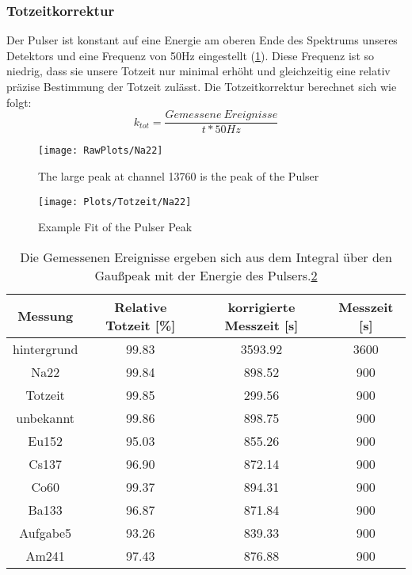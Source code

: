 \documentclass[]{article}
\begin{document}
	\subsubsection{Totzeitkorrektur} 
	Der Pulser ist konstant auf eine Energie am oberen Ende des Spektrums unseres Detektors und eine Frequenz von 50Hz eingestellt (\ref{fig:rawNa22}). Diese Frequenz ist so niedrig, dass sie unsere Totzeit nur minimal erhöht und gleichzeitig eine relativ präzise Bestimmung der Totzeit zulässt. Die Totzeitkorrektur berechnet sich wie folgt:
	\begin{equation}
	k_{tot}=\frac{Gemessene \: Ereignisse}{t*50Hz}
	\end{equation}
	\begin{figure}
		\centering
		\texttt{[image: RawPlots/Na22]}
		\caption{The large peak at channel 13760 is the peak of the Pulser}
		\label{fig:rawNa22}
	\end{figure}
	\begin{figure}
		\centering
		\texttt{[image: Plots/Totzeit/Na22]}
		\caption{Example Fit of the Pulser Peak}
		\label{fig:DeadTimena22}
	\end{figure}
	
	\begin{table}[H]
		\centering
		\begin{tabular}{|c|c|c|c|}
			\hline
			Messung & Relative Totzeit [\%] & korrigierte Messzeit [s] & Messzeit [s] \\ \hline\hline
			hintergrund & 99.83 & 3593.92 & 3600 \\ \hline
			Na22 & 99.84 & 898.52 & 900 \\ \hline
			Totzeit & 99.85 & 299.56 & 900 \\ \hline
			unbekannt & 99.86 & 898.75 & 900 \\ \hline
			Eu152 & 95.03 & 855.26 & 900 \\ \hline
			Cs137 & 96.90 & 872.14 & 900 \\ \hline
			Co60 & 99.37 & 894.31 & 900 \\ \hline
			Ba133 & 96.87 & 871.84 & 900 \\ \hline
			Aufgabe5 & 93.26 & 839.33 & 900 \\ \hline
			Am241 & 97.43 & 876.88 & 900 \\ \hline
			\hline
		\end{tabular}
		\caption{Die Gemessenen Ereignisse ergeben sich aus dem Integral über den Gaußpeak mit der Energie des Pulsers.\ref{fig:DeadTimena22} \label{}}
	\end{table}
	
\end{document}
